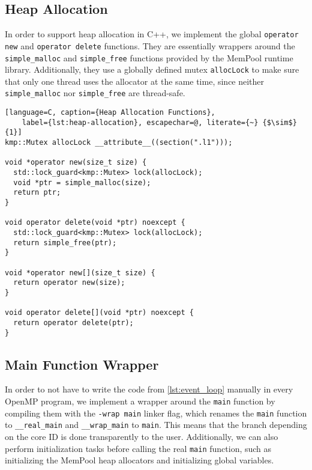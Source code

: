 \subsection{Heap Allocation}

In order to support heap allocation in C++, we implement the global \texttt{operator new} and
\texttt{operator delete} functions. They are essentially wrappers around the \texttt{simple\_malloc}
and \texttt{simple\_free} functions provided by the MemPool runtime library. Additionally, they use
a globally defined mutex \texttt{allocLock} to make sure that only one thread uses the allocator at
the same time, since neither \texttt{simple\_malloc} nor \texttt{simple\_free} are thread-safe.

\begin{lstlisting}[language=C, caption={Heap Allocation Functions},
	label={lst:heap-allocation}, escapechar=@, literate={~} {$\sim$}{1}]
kmp::Mutex allocLock __attribute__((section(".l1")));

void *operator new(size_t size) {
  std::lock_guard<kmp::Mutex> lock(allocLock);
  void *ptr = simple_malloc(size);
  return ptr;
}

void operator delete(void *ptr) noexcept {
  std::lock_guard<kmp::Mutex> lock(allocLock);
  return simple_free(ptr);
}

void *operator new[](size_t size) {
  return operator new(size);
}

void operator delete[](void *ptr) noexcept {
  return operator delete(ptr);
}
\end{lstlisting}


\subsection{Main Function Wrapper}

In order to not have to write the code from \cref{lst:event_loop} manually in every OpenMP program,
we implement a wrapper around the \texttt{main} function by compiling them with the \texttt{-wrap
	main} linker flag, which renames the \texttt{main} function to \texttt{\_\_real\_main} and
\texttt{\_\_wrap\_main} to \texttt{main}. This means that the branch depending on the core ID is
done transparently to the user. Additionally, we can also perform initialization tasks before
calling the real \texttt{main} function, such as initializing the MemPool heap allocators and
initializing global variables.

